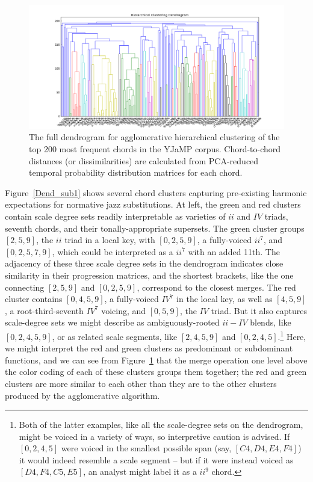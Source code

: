 \begin{figure}
	\centering
	\includegraphics[width=6in]{Dendrogram_complete.png}
	\caption{The full dendrogram for agglomerative hierarchical clustering of the top 200 most frequent chords in the YJaMP corpus.  Chord-to-chord distances (or dissimilarities) are calculated from PCA-reduced temporal probability distribution matrices for each chord.}
	\label{Dend_complete}
\end{figure}

Figure~\ref{Dend_sub1} shows several chord clusters capturing pre-existing harmonic expectations for normative jazz substitutions.  At left, the green and red clusters contain scale degree sets readily interpretable as varieties of $ii$ and $IV$ triads, seventh chords, and their tonally-appropriate supersets.  The green cluster groups $[2,5,9]$, the $ii$ triad in a local key, with $[0,2,5,9]$, a fully-voiced $ii^7$, and $[0,2,5,7,9]$, which could be interpreted as a $ii^{7}$ with an added 11th.  The adjacency of these three scale degree sets in the dendrogram indicates close similarity in their progression matrices, and the shortest brackets, like the one connecting $[2,5,9]$ and $[0,2,5,9]$, correspond to the closest merges.  The red cluster contains $[0,4,5,9]$, a fully-voiced $IV^7$ in the local key, as well as $[4,5,9]$, a root-third-seventh $IV^7$ voicing, and $[0,5,9]$, the $IV$ triad.  But it also captures scale-degree sets we might describe as ambiguously-rooted $ii-IV$ blends, like $[0,2,4,5,9]$, or as related scale segments, like $[2,4,5,9]$ and $[0,2,4,5]$.\footnote{Both of the latter examples, like all the scale-degree sets on the dendrogram, might be voiced in a variety of ways, so interpretive caution is advised.  If $[0,2,4,5]$ were voiced in the smallest possible span (say, $[C4,D4,E4,F4]$) it would indeed resemble a scale segment -- but if it were instead voiced as $[D4,F4,C5,E5]$, an analyst might label it as a $ii^9$ chord.}   Here, we might interpret the red and green clusters as predominant or subdominant functions, and we can see from Figure~\ref{Dend_complete} that the merge operation one level above the color coding of each of these clusters groups them together; the red and green clusters are more similar to each other than they are to the other clusters produced by the agglomerative algorithm.

